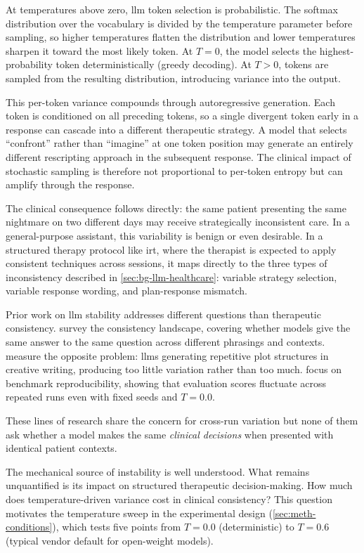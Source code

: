 At temperatures above zero, \gls{llm} token selection is probabilistic.
The softmax distribution over the vocabulary is divided by the temperature
parameter before sampling, so higher temperatures flatten the distribution
and lower temperatures sharpen it toward the most likely token. At $T = 0$,
the model selects the highest-probability token deterministically (greedy
decoding). At $T > 0$, tokens are sampled from the resulting distribution,
introducing variance into the output.

This per-token variance compounds through autoregressive generation. Each
token is conditioned on all preceding tokens, so a single divergent token
early in a response can cascade into a different therapeutic
strategy. A model that selects ``confront'' rather than ``imagine'' at one
token position may generate an entirely different rescripting approach in the
subsequent response. The clinical impact of stochastic sampling is therefore not proportional
to per-token entropy but can amplify through the response.

The clinical consequence follows directly: the same patient presenting the same
nightmare on two different days may receive strategically inconsistent care.
In a general-purpose assistant, this variability is benign or even
desirable. In a structured therapy protocol like \gls{irt}, where the
therapist is expected to apply consistent techniques across sessions, it
maps directly to the three types of inconsistency described in
\autoref{sec:bg-llm-healthcare}: variable strategy selection, variable
response wording, and plan-response mismatch.

Prior work on \gls{llm} stability addresses different questions than
therapeutic consistency. \textcite{BMA3X2SS} survey the consistency
landscape, covering whether models give the same answer to the same
question across different phrasings and contexts. \textcite{RPEDMF63}
measure the opposite problem: \glspl{llm} generating repetitive plot
structures in creative writing, producing too little variation rather
than too much. \textcite{54A9ZU2N} focus on benchmark reproducibility,
showing that evaluation scores fluctuate across repeated runs even with
fixed seeds and $T = 0.0$.

These lines of research share the concern for cross-run variation but
none of them ask whether a model makes the same \emph{clinical decisions}
when presented with identical patient contexts.

The mechanical source of instability is well understood. What remains
unquantified is its impact on structured therapeutic decision-making. How
much does temperature-driven variance cost in clinical consistency? This
question motivates the temperature sweep in the experimental design
(\autoref{sec:meth-conditions}), which tests five points from $T = 0.0$
(deterministic) to $T = 0.6$ (typical vendor default for open-weight
models).

